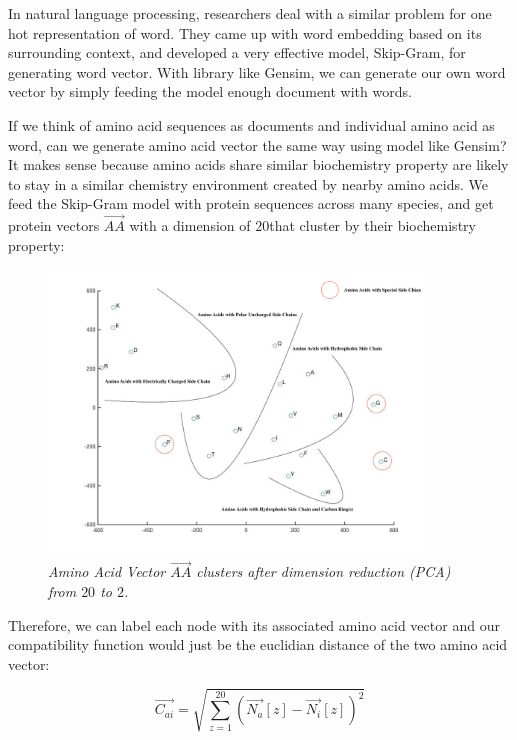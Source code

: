 In natural language processing, researchers deal with a similar problem for one hot representation of word. They came up with word embedding based on its surrounding context, and developed a very effective model, Skip-Gram, for generating word vector. With library like Gensim\footnotemark, we can generate our own word vector by simply feeding the model enough document with words.\\

If we think of amino acid sequences as documents and individual amino acid as word, can we generate amino acid vector the same way using model like Gensim? It makes sense because amino acids share similar biochemistry property are likely to stay in a similar chemistry environment created by nearby amino acids. We feed the Skip-Gram model with protein sequences across many species, and get protein vectors $\overrightarrow{AA}$ with a dimension of $20$\footnotemark that cluster by their biochemistry property:

\begin{figure}[h]
	\centering
	\captionsetup{justification=centering}
	\includegraphics[width=0.9\textwidth]{figs/a2v.png}
	\caption[Caption for LOF]{\emph{Amino Acid Vector $\overrightarrow{AA}$ clusters after dimension reduction (PCA) from $20$ to $2$.}}
	\label{fig:a2v}
\end{figure}

Therefore, we can label each node with its associated amino acid vector and our compatibility function would just be the euclidian distance of the two amino acid vector:

\begin{equation} 
\overrightarrow{C_{ai}}=\sqrt{\sum_{z=1}^{20}(\overrightarrow{N_{a}}[z]-\overrightarrow{N_{i}}[z])^2}
\end{equation}

